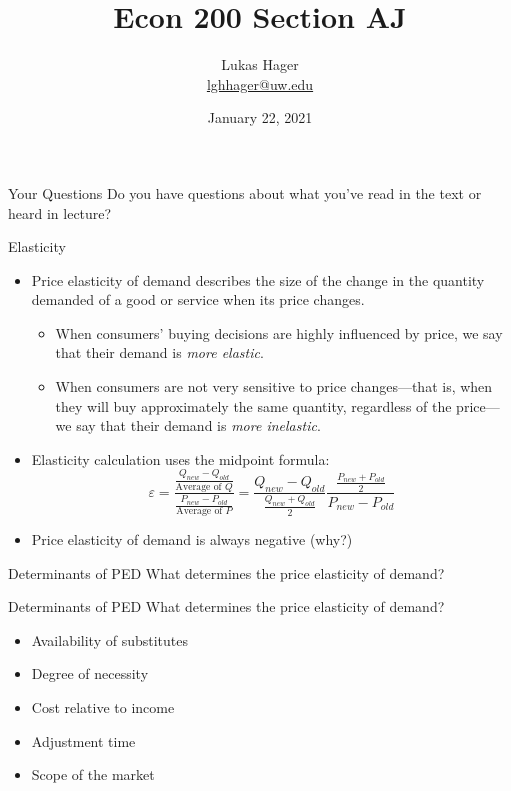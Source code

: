 \documentclass{beamer}
\title{Econ 200 Section AJ}
\author{Lukas Hager \\ \href{mailto:lghhager@uw.edu}{lghhager@uw.edu}}
\institute{Office Hours: Monday 8-9, Thursday 3:30-4:30}
\date{January 22, 2021}
\begin{document}
\begin{frame}
  \titlepage
\end{frame}


\begin{frame}{Your Questions}
    Do you have questions about what you've read in the text or heard in lecture?
\end{frame}

\begin{frame}{Elasticity}
    \begin{itemize}
        \item Price elasticity of demand describes the size of the change in the quantity demanded of a good or service when its price changes.
        \begin{itemize}
            \item When consumers’ buying decisions are highly influenced by price, we say that their demand is \textit{more elastic}.
            \item When consumers are not very sensitive to price changes—that is, when they will buy approximately the same quantity, regardless of the price—we say that their demand is \textit{more inelastic}.
        \end{itemize}
        \item Elasticity calculation uses the midpoint formula:
        \[\varepsilon = \frac{\frac{Q_{new} - Q_{old}}{\text{Average of $Q$}}}{\frac{P_{new} - P_{old}}{\text{Average of $P$}}} = \frac{Q_{new} - Q_{old}}{\frac{Q_{new} + Q_{old}}{2}} \frac{\frac{P_{new} + P_{old}}{2}}{P_{new} - P_{old}}\]
        \item Price elasticity of demand is always negative (why?)
    \end{itemize}
\end{frame}

\begin{frame}[t]{Determinants of PED}
    What determines the price elasticity of demand?
\end{frame}

\begin{frame}[t]{Determinants of PED}
    What determines the price elasticity of demand?
    \begin{itemize}
        \item Availability of substitutes
        \item Degree of necessity
        \item Cost relative to income
        \item Adjustment time
        \item Scope of the market
    \end{itemize}
\end{frame}
\end{document}
